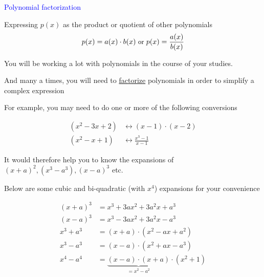 \documentclass[14pt,fleqn]{extarticle}
\begin{document}
\begin{skill}
\begin{narrow}
\textcolor{blue}{Polynomial factorization}

Expressing $p(x)$ as the product or quotient of other polynomials
\[ \small p(x) = a(x)\cdot b(x)\text{ or } p(x) = \frac{a(x)}{b(x)}\]
\end{narrow}

\reason

You will be working a lot with polynomials in the  course of your studies. \newline 

And many a times, you will need to \underline{factorize} polynomials in order to simplify a complex expression \newline 

For example, you may need to do one or more of the following conversions
 
\begin{align}
	\left(x^2 - 3x + 2 \right) &\longleftrightarrow \left(x-1 \right)\cdot \left(x-2 \right) \\
	\left(x^2-x+1 \right)&\longleftrightarrow \frac{x^3-1}{x-1}
\end{align}


It would therefore help you to know the expansions of $(x+a)^2, (x^3-a^3), (x-a)^3$ etc. \newline 

Below are some cubic and bi-quadratic (with $x^4$) expansions for your convenience 

\begin{align}
	(x+a)^3 &= x^3 + 3ax^2 + 3a^2x + a^3 \\
	(x-a)^3 &= x^3 - 3ax^2 + 3a^2 x - a^3 \\
	x^3+a^3 &= (x+a)\cdot (x^2-ax+a^2) \\ 
	x^3 - a^3 &= (x-a)\cdot (x^2 + ax  -a^3) \\ 
	x^4 - a^4 &= \underbrace{(x-a)\cdot (x+a)}_{= x^2 - a^2}\cdot (x^2 + 1) 
\end{align}


\end{skill}
\end{document}

